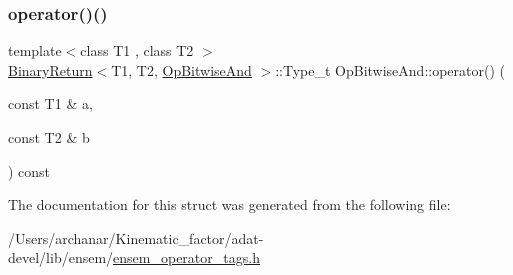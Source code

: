 \subsubsection{\texorpdfstring{operator()()}{operator()()}\hspace{0.1cm}{\footnotesize\ttfamily [3/3]}}
{\footnotesize\ttfamily template$<$class T1 , class T2 $>$ \\
\mbox{\hyperlink{structBinaryReturn}{Binary\+Return}}$<$T1, T2, \mbox{\hyperlink{structOpBitwiseAnd}{Op\+Bitwise\+And}} $>$\+::Type\+\_\+t Op\+Bitwise\+And\+::operator() (\begin{DoxyParamCaption}\item[{const T1 \&}]{a,  }\item[{const T2 \&}]{b }\end{DoxyParamCaption}) const\hspace{0.3cm}{\ttfamily [inline]}}



The documentation for this struct was generated from the following file\+:\begin{DoxyCompactItemize}
\item 
/\+Users/archanar/\+Kinematic\+\_\+factor/adat-\/devel/lib/ensem/\mbox{\hyperlink{adat-devel_2lib_2ensem_2ensem__operator__tags_8h}{ensem\+\_\+operator\+\_\+tags.\+h}}\end{DoxyCompactItemize}
